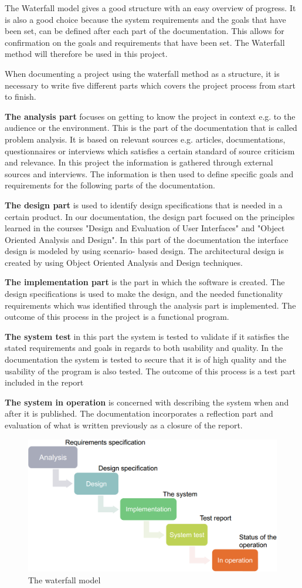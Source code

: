 The Waterfall model gives a good structure with an easy overview of progress. It is also a good choice because the system requirements and the goals that have been set, can be defined after each part of the documentation. This allows for confirmation on the goals and requirements that have been set. The Waterfall method will therefore be used in this project.       

When documenting a project using the waterfall method as a structure, it is necessary to write five different parts which covers the project process from start to finish.

\textbf{The analysis part} focuses on getting to know the project in context e.g. to the audience or the environment. This is the part of the documentation that is called problem analysis. It is based on relevant sources e.g. articles, documentations, questionnaires or interviews which satisfies a certain standard of source criticism and relevance. In this project the information is gathered through external sources and interviews. The information is then used to define specific goals and requirements for the following parts of the documentation.

\textbf{The design part} is used to identify design specifications that is needed in a certain product. In our documentation, the design part focused on the principles learned in the courses "Design and Evaluation of User Interfaces" and "Object Oriented Analysis and Design". In this part of the documentation the interface design is modeled by using scenario- based design. The architectural design is created by using Object Oriented Analysis and Design techniques. 

\textbf{The implementation part} is the part in which the software is created. The design specifications is used to make the design, and the needed functionality requirements which was identified through the analysis part is implemented. The outcome of this process in the project is a functional program.

\textbf{The system test} in this part the system is tested to validate if it satisfies the stated requirements and goals in regards to both usability and quality. In the documentation the system is tested to secure that it is of high quality and the usability of the program is also tested. The outcome of this process is a test part included in the report

\textbf{The system in operation} is concerned with describing the system when and after it is published. The documentation incorporates a reflection part and evaluation of what is written previously as a closure of the report.

\begin{figure}[H]
\includegraphics[width=\linewidth, clip=true]{Grafik/FoodPlanner/Waterfall}
\centering
\caption{The waterfall model}
\end{figure}